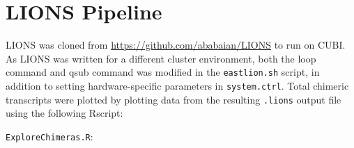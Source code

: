 \documentclass[onehalf,12pt]{beavtex}
\begin{document}
  \section{LIONS Pipeline}\label{lions-pipeline}
  
  LIONS was cloned from \url{https://github.com/ababaian/LIONS} to run on
  CUBI. As LIONS was written for a different cluster environment, both the
  loop command and qsub command was modified in the \texttt{eastlion.sh}
  script, in addition to setting hardware-specific parameters in
  \texttt{system.ctrl}. Total chimeric transcripts were plotted by
  plotting data from the resulting \texttt{.lions} output file using the
  following Rscript:
  
  \texttt{ExploreChimeras.R}:
  
  \begin{Shaded}
  \begin{Highlighting}[]
  \NormalTok{(} \NormalTok{)}
  \NormalTok{(}\NormalTok{)}
  
  
  \StringTok{ }\NormalTok{(}\NormalTok{, } \NormalTok{, } \NormalTok{)}
  

\end{Highlighting}
\end{Shaded}
\end{document}
